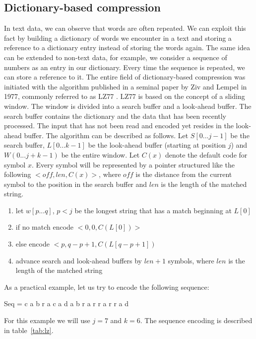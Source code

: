 \subsection*{Dictionary-based compression}
In text data, we can observe that words are often repeated. We can exploit this fact by
building a dictionary of words we encounter in a text and storing a reference to a dictionary
entry instead of storing the words again. The same idea can be extended to non-text data, for
example, we consider a sequence of numbers as an entry in our dictionary. Every time the
sequence is repeated, we can store a reference to it.
The entire field of dictionary-based compression was initiated with the algorithm published
in a seminal paper by Ziv and Lempel in 1977, commonly referred to as LZ77 \cite{Ziv1977A}.
LZ77 is based on the concept of a sliding window. The window is divided into a search buffer
and a look-ahead buffer. The search buffer contains the dictionary and the data that has been
recently processed. The input that has not been read and encoded yet resides in the look-ahead
buffer.
The algorithm can be described as follows. Let $S[0...j -1]$ be the search buffer, 
$L[0...k-1]$ be the look-ahead buffer (starting at position $j$) and $W(0...j+k-1)$
be the entire window. Let $C(x)$ denote the default code for symbol $x$.
Every symbol will be represented by a pointer structured like the following
$<off, len, C(x)>$, where $off$ is the distance from the current symbol to the
position in the search buffer and $len$ is the length of the matched string.
\begin{enumerate}
	\item let $w[p...q]$, $p < j$ be the longest string that has a match beginning at $L[0]$

	\item if no match encode $<0, 0, C(L[0])>$

	\item else encode $<p, q - p + 1, C(L[q - p + 1])$

	\item advance search and look-ahead buffers by $len + 1$ symbols, where $len$ is the length
    of the matched string
\end{enumerate}
As a practical example, let us try to encode the following sequence:
\begin{center}
Seq = c a b r a c a d a b r a r r a r r a d
\end{center}
For this example we will use $j=7$ and $k=6$. The sequence encoding is described in table~\ref{tab:lz}.
